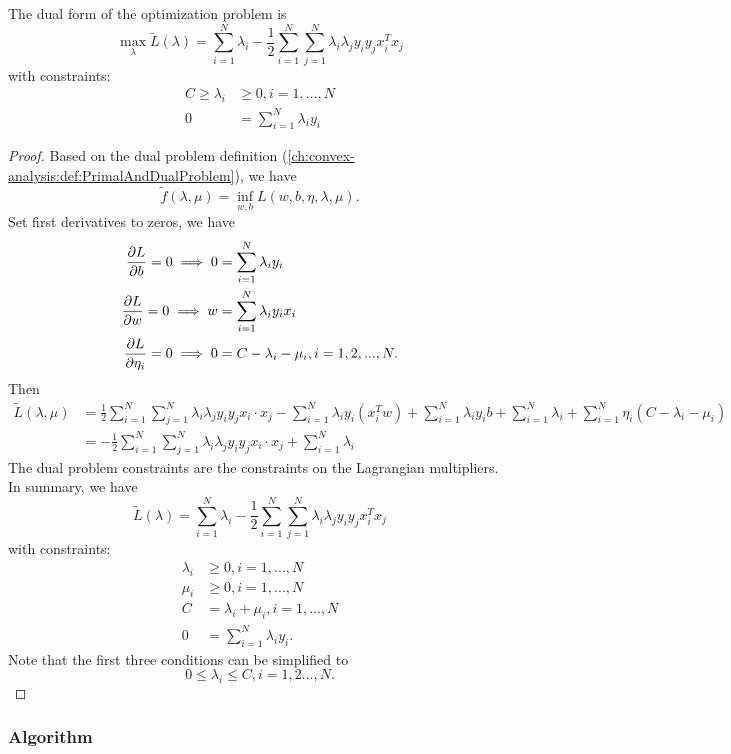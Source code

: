 \begin{refsection}
\begin{theorem}\cite[333]{bishop2006pattern}
	The dual form of the optimization problem is
	$$\max_{\lambda}\tilde{L}(\lambda) = \sum_{i=1}^N \lambda_i - \frac{1}{2}\sum_{i=1}^N\sum_{j=1}^N \lambda_i\lambda_j y_iy_j x_i^Tx_j$$
	with constraints:
	\begin{align*}
	C\geq \lambda_i &\geq 0, i = 1,...,N\\
	0 &= \sum_{i=1}^N \lambda_iy_i
	\end{align*}
\end{theorem}
\begin{proof}
Based on the dual problem definition (\autoref{ch:convex-analysis:def:PrimalAndDualProblem}), we have
$$\tilde{f}(\lambda, \mu) = \inf_{w,b} L(w,b,\eta,\lambda,\mu).$$
Set first derivatives to zeros, we have
\begin{align*}
\frac{\partial L}{\partial b} = 0 \implies 0 &= \sum_{i=1}^N \lambda_iy_i\\
\frac{\partial L}{\partial w} = 0 \implies w &= \sum_{i=1}^N \lambda_iy_ix_i \\
\frac{\partial L}{\partial \eta_i} = 0 \implies 0 &= C-\lambda_i-\mu_i, i=1,2,...,N.
\end{align*}
Then
\begin{align*}
\tilde{L}(\lambda,\mu) &=\frac{1}{2}\sum_{i=1}^N\sum_{j=1}^N \lambda_i\lambda_j y_iy_j x_i\cdot x_j - \sum_{i=1}^N \lambda_i y_i(x_i^Tw)  + \sum_{i=1}^N \lambda_iy_ib + \sum_{i=1}^N \lambda_i + \sum_{i=1}^N \eta_i (C - \lambda_i-\mu_i)\\
&= -\frac{1}{2}\sum_{i=1}^N\sum_{j=1}^N \lambda_i\lambda_j y_iy_j x_i\cdot x_j + \sum_{i=1}^N \lambda_i
\end{align*}
The dual problem constraints are the constraints on the Lagrangian multipliers. In summary, we have
	$$\tilde{L}(\lambda) = \sum_{i=1}^N \lambda_i - \frac{1}{2}\sum_{i=1}^N\sum_{j=1}^N \lambda_i\lambda_j y_iy_j x_i^Tx_j$$
with constraints:
\begin{align*}
\lambda_i &\geq 0, i = 1,...,N\\
 \mu_i &\geq 0, i = 1,...,N\\
 C &= \lambda_i + \mu_i , i = 1,...,N\\
0 &= \sum_{i=1}^N \lambda_iy_i.
\end{align*}
Note that the first three conditions can be simplified to 
$$0\leq \lambda_i\leq C, i =1,2...,N.$$
\end{proof}

\subsubsection{Algorithm}



\end{refsection}
